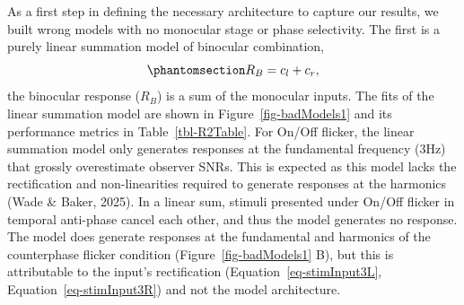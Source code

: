 \documentclass[
  12pt,
]{article}
\begin{document}
As a first step in defining the necessary architecture to capture our
results, we built wrong models with no monocular stage or phase
selectivity. The first is a purely linear summation model of binocular
combination, \begin{equation}\phantomsection\label{eq-linearSumModel}{
R_B = c_l+c_r,
}\end{equation} the binocular response (\(R_B\)) is a sum of the
monocular inputs. The fits of the linear summation model are shown in
Figure~\ref{fig-badModels1} and its performance metrics in
Table~\ref{tbl-R2Table}. For On/Off flicker, the linear summation model
only generates responses at the fundamental frequency (3Hz) that grossly
overestimate observer SNRs. This is expected as this model lacks the
rectification and non-linearities required to generate responses at the
harmonics (Wade \& Baker, 2025). In a linear sum, stimuli presented
under On/Off flicker in temporal anti-phase cancel each other, and thus
the model generates no response. The model does generate responses at
the fundamental and harmonics of the counterphase flicker condition
(Figure~\ref{fig-badModels1} B), but this is attributable to the input's
rectification
(Equation~\ref{eq-stimInput3L}, Equation~\ref{eq-stimInput3R}) and not
the model architecture.
\end{document}
